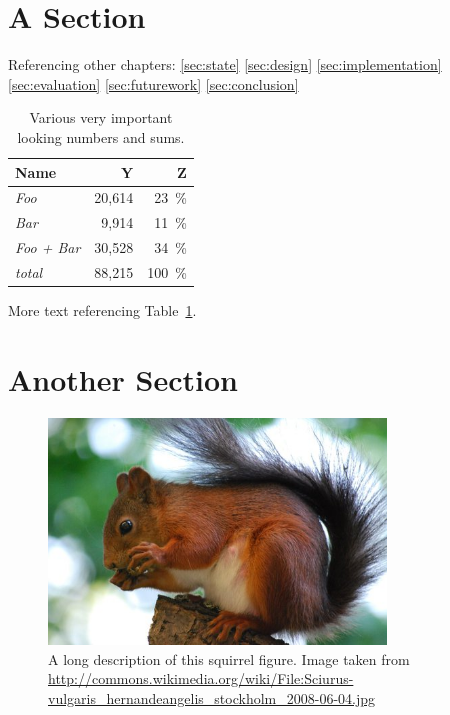\section{A Section}

Referencing other chapters: \ref{sec:state} \ref{sec:design}
\ref{sec:implementation} \ref{sec:evaluation} \ref{sec:futurework}
\ref{sec:conclusion}

\begin{table}[htp]
  \centering
  \begin{tabular}{lrr}
    \textbf{Name} & \textbf{Y} & \textbf{Z} \\
    \hline
    \textit{Foo} & 20,614 & \SI{23}{\percent} \\
    \textit{Bar} & 9,914 & \SI{11}{\percent} \\
    \textit{Foo + Bar} & 30,528 & \SI{34}{\percent} \\
    \hline
    \textit{total} & 88,215 & \SI{100}{\percent} \\

  \end{tabular}
  \caption[Some interesting numbers]{Various very important looking numbers and sums.}
  \label{tab:numbers}
\end{table}

More text referencing Table~\ref{tab:numbers}.

\section{Another Section}

\begin{figure}[tbp]
  \centering
  \includegraphics[width=0.8\textwidth]{images/squirrel}
  \caption[Short description]{A long description of this squirrel figure.
  Image taken from
  \url{http://commons.wikimedia.org/wiki/File:Sciurus-vulgaris_hernandeangelis_stockholm_2008-06-04.jpg}}
  \label{fig:squirrel}
\end{figure}

